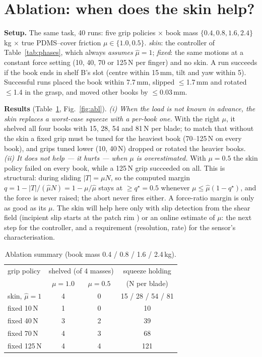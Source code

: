 \documentclass[10pt,twocolumn]{article}
\begin{document}
\section{Ablation: when does the skin help?}\label{sec:abl}
\textbf{Setup.} The same task, 40 runs: five grip policies $\times$ book mass $\{0.4,0.8,1.6,2.4\}$\,kg $\times$
true PDMS--cover friction $\mu\in\{1.0,0.5\}$. \emph{skin}: the controller of Table~\ref{tab:phases}, which always
\emph{assumes} $\hat\mu=1$; \emph{fixed}: the same motions at a constant force setting (10, 40, 70 or 125\,N per
finger) and no skin. A run succeeds if the book ends in shelf B's slot (centre within 15\,mm, tilt and yaw within
5\textdegree). Successful runs placed the book within 7.7\,mm, slipped $\le$1.7\,mm and rotated $\le$1.4\textdegree{}
in the grasp, and moved other books by $\le$0.03\,mm.

\textbf{Results} (Table~\ref{tab:abl}, Fig.~\ref{fig:abl}). \emph{(i) When the load is not known in advance, the skin
replaces a worst-case squeeze with a per-book one.} With the right $\mu$, it shelved all four books with 15, 28, 54
and 81\,N per blade; to match that without the skin a fixed grip must be tuned for the heaviest book (70--125\,N on
every book), and grips tuned lower (10, 40\,N) dropped or rotated the heavier books. \emph{(ii) It does not help ---
it hurts --- when $\mu$ is overestimated.} With $\mu=0.5$ the skin policy failed on every book, while a 125\,N grip
succeeded on all. This is structural: during sliding $|T|=\mu N$, so the computed margin
$q=1-|T|/(\hat\mu N)=1-\mu/\hat\mu$ stays at $\ge q^\star=0.5$ whenever $\mu\le\hat\mu(1-q^\star)$, and the force is
never raised; the abort never fires either. A force-ratio margin is only as good as its $\mu$. The skin will help
here only with slip detection from the shear field (incipient slip starts at the patch rim
\cite{johnson1985,dong2017,romano2011}) or an online estimate of $\mu$: the next step for the controller, and a
requirement (resolution, rate) for the sensor's characterisation.

\begin{table}[t]\centering\footnotesize
\setlength{\tabcolsep}{4pt}
\begin{tabular}{@{}lccc@{}}
\toprule
grip policy & \multicolumn{2}{c}{shelved (of 4 masses)} & squeeze holding \\
 & $\mu=1.0$ & $\mu=0.5$ & (N per blade) \\
\midrule
skin, $\hat\mu=1$ & 4 & 0 & 15 / 28 / 54 / 81 \\
fixed 10\,N & 1 & 0 & 10 \\
fixed 40\,N & 3 & 2 & 39 \\
fixed 70\,N & 4 & 3 & 68 \\
fixed 125\,N & 4 & 4 & 121 \\
\bottomrule
\end{tabular}
\caption{Ablation summary (book mass 0.4 / 0.8 / 1.6 / 2.4\,kg).}
\label{tab:abl}
\end{table}
\end{document}
